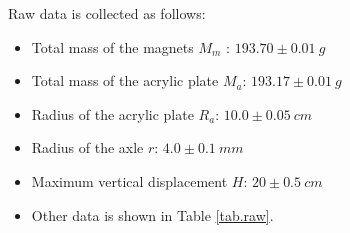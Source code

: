 \documentclass[a4paper]{article}
\begin{document}
Raw data is collected as follows:

\begin{itemize}
    \item Total mass of the magnets $M_m$ : $193.70\pm0.01\SI{}{g}$
    \item Total mass of the acrylic plate $M_a$: $193.17\pm0.01\SI{}{g}$
    \item Radius of the acrylic plate $R_a$: $10.0\pm0.05\SI{}{cm}$
    \item Radius of the axle $r$: $4.0\pm0.1\SI{}{mm}$
    \item Maximum vertical displacement $H$: $20\pm0.5\SI{}{cm}$
    \item Other data is shown in Table \ref{tab.raw}.
\end{itemize}
\end{document}
